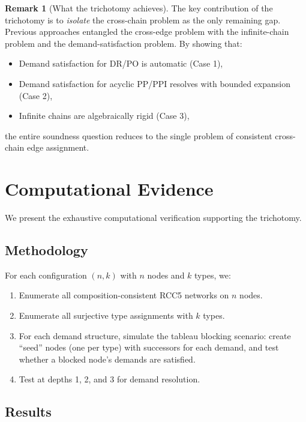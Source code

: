 \documentclass[a4paper,11pt]{article}
\theoremstyle{definition}
\newtheorem{remark}[theorem]{Remark}
\begin{document}
\begin{remark}[What the trichotomy achieves]
The key contribution of the trichotomy is to \emph{isolate} the
cross-chain problem as the only remaining gap.  Previous approaches
entangled the cross-edge problem with the infinite-chain problem
and the demand-satisfaction problem.  By showing that:
\begin{itemize}[nosep]
  \item Demand satisfaction for DR/PO is automatic (Case 1),
  \item Demand satisfaction for acyclic PP/PPI resolves with
    bounded expansion (Case 2),
  \item Infinite chains are algebraically rigid (Case 3),
\end{itemize}
the entire soundness question reduces to the single problem of
consistent cross-chain edge assignment.
\end{remark}


\section{Computational Evidence}
\label{sec:computation}

We present the exhaustive computational verification supporting
the trichotomy.

\subsection{Methodology}

For each configuration $(n, k)$ with $n$ nodes and $k$ types, we:
\begin{enumerate}[nosep]
  \item Enumerate all composition-consistent RCC5 networks on $n$ nodes.
  \item Enumerate all surjective type assignments with $k$ types.
  \item For each demand structure, simulate the tableau blocking scenario:
    create ``seed'' nodes (one per type) with successors for each demand,
    and test whether a blocked node's demands are satisfied.
  \item Test at depths 1, 2, and 3 for demand resolution.
\end{enumerate}

\subsection{Results}
\end{document}
